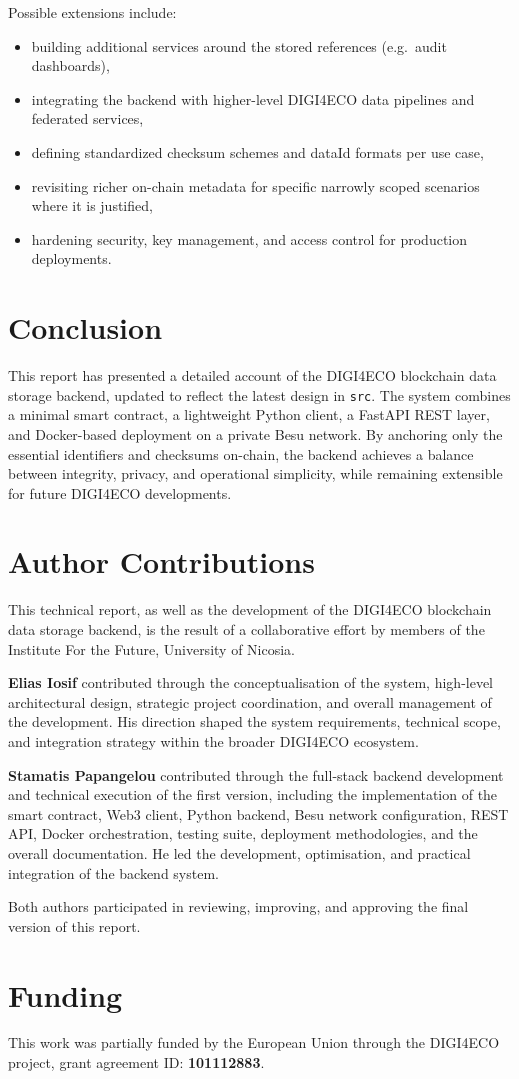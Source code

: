 \documentclass[11pt,a4paper]{article}
\begin{document}
Possible extensions include:

\begin{itemize}[noitemsep]
  \item building additional services around the stored references (e.g.\ audit dashboards),
  \item integrating the backend with higher-level DIGI4ECO data pipelines and federated services,
  \item defining standardized checksum schemes and dataId formats per use case,
  \item revisiting richer on-chain metadata for specific narrowly scoped scenarios where it is justified,
  \item hardening security, key management, and access control for production deployments.
\end{itemize}

\section*{Conclusion}

This report has presented a detailed account of the DIGI4ECO blockchain data storage backend, updated to reflect the latest design in \texttt{src}. The system combines a minimal smart contract, a lightweight Python client, a FastAPI REST layer, and Docker-based deployment on a private Besu network. By anchoring only the essential identifiers and checksums on-chain, the backend achieves a balance between integrity, privacy, and operational simplicity, while remaining extensible for future DIGI4ECO developments.

\section*{Author Contributions}

This technical report, as well as the development of the DIGI4ECO blockchain data storage backend, is the result of a collaborative effort by members of the Institute For the Future, University of Nicosia.

\textbf{Elias Iosif} contributed through the conceptualisation of the system, high-level architectural design, strategic project coordination, and overall management of the development. His direction shaped the system requirements, technical scope, and integration strategy within the broader DIGI4ECO ecosystem.

\textbf{Stamatis Papangelou} contributed through the full-stack backend development and technical execution of the first version, including the implementation of the smart contract, Web3 client, Python backend, Besu network configuration, REST API, Docker orchestration, testing suite, deployment methodologies, and the overall documentation. He led the development, optimisation, and practical integration of the backend system.

Both authors participated in reviewing, improving, and approving the final version of this report.

\section*{Funding}

This work was partially funded by the European Union through the DIGI4ECO project, grant agreement ID: \textbf{101112883}.
\end{document}
